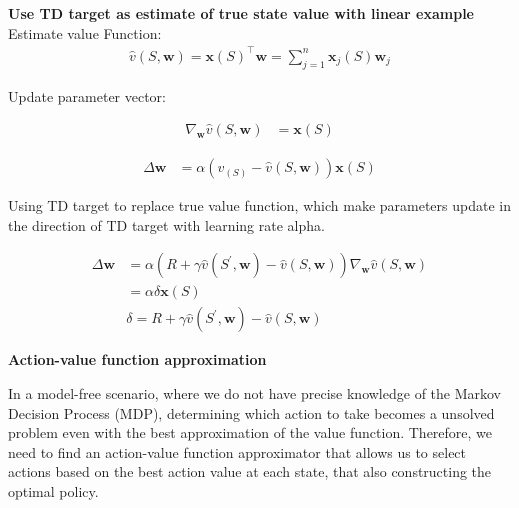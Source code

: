 \documentclass{article}
\begin{document}
\begin{mdframed}[hidealllines=true,backgroundcolor=gray!20]
\textbf{Use TD target as estimate of true state value with linear example}\\

Estimate value Function:
\begin{equation}
\begin{aligned} \hat{v}(S, \mathbf{w})=\mathbf{x}(S)^{\top} \mathbf{w}=\sum_{j=1}^n \mathbf{x}_j(S) \mathbf{w}_j \end{aligned}
\end{equation}


Update parameter vector:

\begin{equation}
\begin{aligned} \nabla_{\mathbf{w}} \hat{v}(S, \mathbf{w}) & =\mathbf{x}(S) \end{aligned}
\end{equation}

\begin{equation}
\begin{aligned} \Delta \mathbf{w} & =\alpha\left(v_(S)-\hat{v}(S, \mathbf{w})\right) \mathbf{x}(S)\end{aligned}
\end{equation}

Using TD target to replace true value function, which make parameters update in the direction of TD target with learning rate alpha.

\begin{equation}
\begin{aligned} \Delta \mathbf{w} & =\alpha\left(R+\gamma \hat{v}\left(S^{\prime}, \mathbf{w}\right)-\hat{v}(S, \mathbf{w})\right) \nabla_{\mathbf{w}} \hat{v}(S, \mathbf{w}) \\ & =\alpha \delta \mathbf{x}(S) \\ &
\delta = R+\gamma \hat{v}\left(S^{\prime}, \mathbf{w}\right)-\hat{v}(S, \mathbf{w}) \end{aligned}
\end{equation}

\end{mdframed}

\hspace*{\fill}

\noindent
\textbf{Action-value function approximation}\\
\noindent

In a model-free scenario, where we do not have precise knowledge of the Markov Decision Process (MDP), determining which action to take becomes a unsolved problem even with the best approximation of the value function. Therefore, we need to find an action-value function approximator that allows us to select actions based on the best action value at each state, that also constructing the optimal policy.
\end{document}

